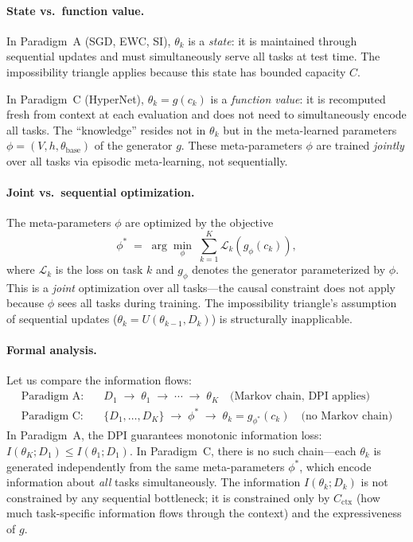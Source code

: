 \documentclass{article}
\begin{document}
\paragraph{State vs.\ function value.} In Paradigm~A (SGD, EWC, SI), $\theta_k$ is a \emph{state}: it is maintained through sequential updates and must simultaneously serve all tasks at test time. The impossibility triangle applies because this state has bounded capacity $C$.

In Paradigm~C (HyperNet), $\theta_k = g(c_k)$ is a \emph{function value}: it is recomputed fresh from context at each evaluation and does not need to simultaneously encode all tasks. The ``knowledge'' resides not in $\theta_k$ but in the meta-learned parameters $\phi = (V, h, \theta_\mathrm{base})$ of the generator $g$. These meta-parameters $\phi$ are trained \emph{jointly} over all tasks via episodic meta-learning, not sequentially.

\paragraph{Joint vs.\ sequential optimization.} The meta-parameters $\phi$ are optimized by the objective
\begin{equation}
    \phi^* \;=\; \arg\min_\phi \;\sum_{k=1}^K \mathcal{L}_k\!\left(g_\phi(c_k)\right),
\end{equation}
where $\mathcal{L}_k$ is the loss on task $k$ and $g_\phi$ denotes the generator parameterized by $\phi$. This is a \emph{joint} optimization over all tasks---the causal constraint does not apply because $\phi$ sees all tasks during training. The impossibility triangle's assumption of sequential updates ($\theta_k = U(\theta_{k-1}, D_k)$) is structurally inapplicable.

\paragraph{Formal analysis.} Let us compare the information flows:
\begin{align}
    \text{Paradigm A:} &\quad D_1 \;\to\; \theta_1 \;\to\; \cdots \;\to\; \theta_K \quad \text{(Markov chain, DPI applies)} \\
    \text{Paradigm C:} &\quad \{D_1, \ldots, D_K\} \;\to\; \phi^* \;\to\; \theta_k = g_{\phi^*}(c_k) \quad \text{(no Markov chain)}
\end{align}
In Paradigm~A, the DPI guarantees monotonic information loss: $I(\theta_K; D_1) \leq I(\theta_1; D_1)$. In Paradigm~C, there is no such chain---each $\theta_k$ is generated independently from the same meta-parameters $\phi^*$, which encode information about \emph{all} tasks simultaneously. The information $I(\theta_k; D_k)$ is not constrained by any sequential bottleneck; it is constrained only by $C_\mathrm{ctx}$ (how much task-specific information flows through the context) and the expressiveness of $g$.
\end{document}
